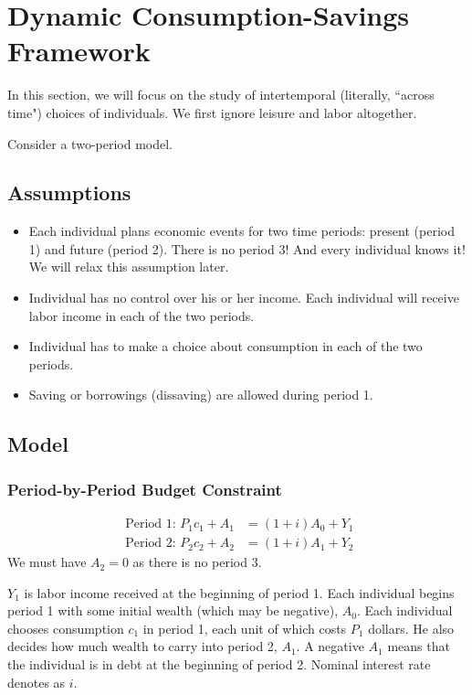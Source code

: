 \documentclass[10pt]{article}
\begin{document}
\section{Dynamic Consumption-Savings Framework}
In this section, we will focus on the study of intertemporal (literally, ``across time")
choices of individuals.
We first ignore  leisure and labor altogether.

Consider a two-period model.

\subsection{Assumptions}
\begin{itemize}
\item 
		Each individual plans economic events for two time periods: present (period 1) and future 
		(period 2). There is no period 3! And every individual knows it!
		We will relax this assumption later.
\item 
		Individual has no control over his or her income. Each individual will receive labor income
		in each of the two periods. 
\item 
		Individual has to make a choice about consumption in each of the two periods.
\item
		Saving or borrowings (dissaving) are allowed during period 1.
\end{itemize}



\subsection{Model}
\subsubsection{Period-by-Period Budget Constraint}

\begin{align}
\text{ Period 1: }P_1c_1 + A_1 &= (1 + i)A_0 + Y_1 \label{eqn:t1_bc}\\
\text{ Period 2: }P_2c_2 + A_2 &= (1 + i)A_1 + Y_2 \label{eqn:t2_bc}
\end{align}
We must have $ A_2 = 0 $ as there is no period 3.



$ Y_1 $ is labor income received at the beginning of period 1. Each individual begins period 1
with some initial wealth (which may be negative), $ A_0 $. 
Each individual chooses consumption $ c_1 $ in period 1, each unit of which costs $ P_1 $ dollars.
He also decides how much wealth to carry into period 2, $ A_1 $. A negative $ A_1 $ means that 
the individual is in debt at the beginning of period 2. Nominal interest rate denotes as $ i $.
\end{document}
